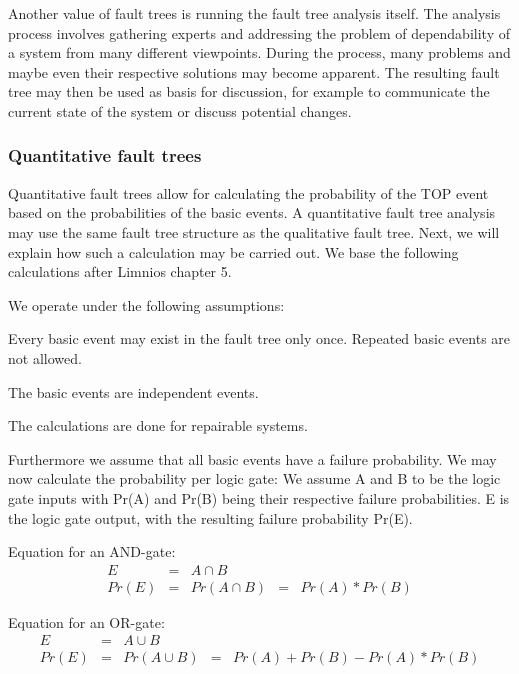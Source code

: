 Another value of fault trees is running the fault tree analysis itself. The analysis process involves gathering experts and addressing the problem of dependability of a system from many different viewpoints. During the process, many problems and maybe even their respective solutions may become apparent. The resulting fault tree may then be used as basis for discussion, for example to communicate the current state of the system or discuss potential changes.

\subsubsection{Quantitative fault trees}

Quantitative fault trees allow for calculating the probability of the TOP event based on the probabilities of the basic events. A quantitative fault tree analysis may use the same fault tree structure as the qualitative fault tree. Next, we will explain how such a calculation may be carried out. We base the following calculations after Limnios \cite{FaulTreesLimnios} chapter 5.

We operate under the following assumptions:
\begin{titemize}
  \item Every basic event may exist in the fault tree only once. Repeated basic events are not allowed.
  \item The basic events are independent events.
  \item The calculations are done for repairable systems.
\end{titemize}

Furthermore we assume that all basic events have a failure probability. We may now calculate the probability per logic gate: We assume A and B to be the logic gate inputs with Pr(A) and Pr(B) being their respective failure probabilities. E is the logic gate output, with the resulting failure probability Pr(E).

Equation for an AND-gate:
\[ \begin{array}{lclcl}
E & = & A \cap B & & \\
Pr(E) & = & Pr(A \cap B) & = & Pr(A) * Pr(B)
\end{array} \]

Equation for an OR-gate:
\[ \begin{array}{lclll}
E & = & A \cup B & & \\
Pr(E) & = & Pr(A \cup B) & = & Pr(A) + Pr(B) - Pr(A) * Pr(B)
\end{array} \]

